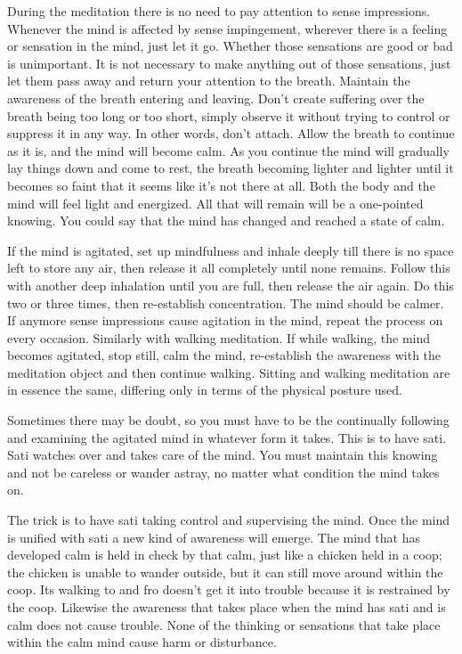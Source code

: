 During the meditation there is no need to pay attention to sense impressions. Whenever the mind is affected by sense impingement, wherever there is a feeling or sensation in the mind, just let it go. Whether those sensations are good or bad is unimportant. It is not necessary to make anything out of those sensations, just let them pass away and return your attention to the breath. Maintain the awareness of the breath entering and leaving. Don't create suffering over the breath being too long or too short, simply observe it without trying to control or suppress it in any way. In other words, don't attach. Allow the breath to continue as it is, and the mind will become calm. As you continue the mind will gradually lay things down and come to rest, the breath becoming lighter and lighter until it becomes so faint that it seems like it's not there at all. Both the body and the mind will feel light and energized. All that will remain will be a one-pointed knowing. You could say that the mind has changed and reached a state of calm. 

If the mind is agitated, set up mindfulness and inhale deeply till there is no space left to store any air, then release it all completely until none remains. Follow this with another deep inhalation until you are full, then release the air again. Do this two or three times, then re-establish concentration. The mind should be calmer. If anymore sense impressions cause agitation in the mind, repeat the process on every occasion. Similarly with walking meditation. If while walking, the mind becomes agitated, stop still, calm the mind, re-establish the awareness with the meditation object and then continue walking. Sitting and walking meditation are in essence the same, differing only in terms of the physical posture used. 

Sometimes there may be doubt, so you must have  to be the  continually following and examining the agitated mind in whatever form it takes. This is to have sati. Sati watches over and takes care of the mind. You must maintain this knowing and not be careless or wander astray, no matter what condition the mind takes on. 

The trick is to have sati taking control and supervising the mind. Once the mind is unified with sati a new kind of awareness will emerge. The mind that has developed calm is held in check by that calm, just like a chicken held in a coop; the chicken is unable to wander outside, but it can still move around within the coop. Its walking to and fro doesn't get it into trouble because it is restrained by the coop. Likewise the awareness that takes place when the mind has sati and is calm does not cause trouble. None of the thinking or sensations that take place within the calm mind cause harm or disturbance. 


